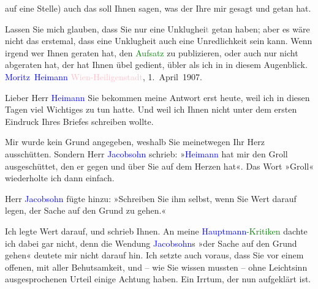                auf eine Stelle) auch das soll Ihnen sagen, was der Ihre mir gesagt und getan
               hat.\pend
           
\pstart
           Lassen Sie mich glauben, dass Sie nur eine Unklughei\textcolor{gray}{t} getan haben; aber es wäre nicht
               das erstemal, dass eine Unklugheit auch eine Unredlichkeit sein kann. Wenn irgend wer
               Ihnen geraten hat, den \textcolor{green}{Aufsatz}{}\ledrightnote{{$\rightarrow$}\textcolor{green}{Der Fall Hauptmann}} zu publizieren, oder auch nur nicht abgeraten hat, der hat Ihnen
               übel gedient, übler als ich in in diesem Augenblick.\pend
           \pstart \spacefill\mbox{\textcolor{blue}{Moritz Heimann}{}\ledrightnote{\textcolor{blue}{Moritz Heimann}}}\pend{}{\bigskip}
\pstart
           \raggedleft{}{\pb}\textcolor{pink}{Wien-Heiligenstadt}{}\ledrightnote{\textcolor{pink}{Heiligenstadt}}, 1\label{K_L03438-10v}\label{K_L03438-10h}. April 1907.\pend
           
\pstart{}Lieber Herr \textcolor{blue}{Heimann}{}\ledrightnote{\textcolor{blue}{Moritz Heimann}}\pend
\pstart
           Sie bekommen meine Antwort erst heute, weil ich in
               diesen Tagen viel Wichtiges zu tun hatte. Und weil ich Ihnen nicht unter dem ersten
               Eindruck Ihres Briefes schreiben wollte.\pend
           
\pstart
           Mir wurde kein Grund angegeben, weshalb Sie meinetwegen Ihr Herz ausschütten. Sondern
               Herr \textcolor{blue}{Jacobsohn}{}\ledrightnote{\textcolor{blue}{Siegfried Jacobsohn}} schrieb: »\textcolor{blue}{Heimann}{}\ledrightnote{\textcolor{blue}{Moritz Heimann}} hat mir den Groll ausgeschüttet, den er gegen und
               über Sie auf dem Herzen hat«. Das Wort »Groll« wiederholte ich dann einfach.\pend
           
\pstart
           Herr \textcolor{blue}{Jacobsohn}{}\ledrightnote{\textcolor{blue}{Siegfried Jacobsohn}} fügte hinzu: »Schreiben Sie ihm
               selbst, wenn Sie Wert darauf legen, der Sache auf den Grund zu gehen.«\pend
           
\pstart
           Ich legte Wert darauf, und schrieb Ihnen. An meine \textcolor{green}{\textcolor{blue}{Hauptmann}{}\ledrightnote{\textcolor{blue}{Gerhart Hauptmann}}-Kritiken}{}\ledrightnote{{$\rightarrow$}\textcolor{green}{Der Fall Hauptmann}{\newline}{$\rightarrow$}\textcolor{green}{Der Fall Brahm}} dachte ich dabei
               gar nicht, denn die Wendung \textcolor{blue}{Jacobsohn}{}\ledrightnote{\textcolor{blue}{Siegfried Jacobsohn}}s »der
               Sache auf den Grund gehen« deutete mir nicht darauf hin. Ich setzte auch voraus, dass
               Sie vor einem offenen, mit aller Behutsamkeit, und – wie Sie wissen mussten – ohne
               Leichtsinn ausgesprochenen Urteil einige Achtung haben. Ein Irrtum, der nun
               aufgeklärt ist.\pend
           

